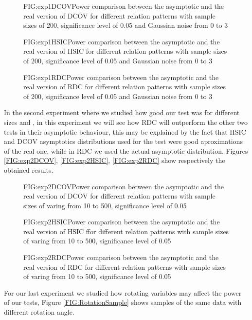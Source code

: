 \begin{figure}[Experiment 1 DCOV asymptotic vs real]{FIG:exp1DCOV}{Power comparison between the asymptotic and the real version of DCOV for different relation patterns with sample sizes of 200, significance level of 0.05 and Gaussian noise from 0 to 3}
\end{figure}
\begin{figure}[Experiment 1 HSIC asymptotic vs real]{FIG:exp1HSIC}{Power comparison between the asymptotic and the real version of HSIC for different relation patterns with sample sizes of 200, significance level of 0.05 and Gaussian noise from 0 to 3}
\end{figure}
\begin{figure}[Experiment 1 RDC asymptotic vs real]{FIG:exp1RDC}{Power comparison between the asymptotic and the real version of RDC for different relation patterns with sample sizes of 200, significance level of 0.05 and Gaussian noise from 0 to 3}
\end{figure}

In the second experiment where we studied how good our test was for different sizes and , in this experiment we will see how RDC will outperform the other two tests in their asymptotic behaviour, this may be explained by the fact that HSIC and DCOV asymptotics distributions used for the test were good aproximations of the real one, while in RDC we used the actual asymptotic distribution. Figures \ref{FIG:exp2DCOV}, \ref{FIG:exp2HSIC}, \ref{FIG:exp2RDC} show respectively the obtained results.

\begin{figure}[Experiment 2 DCOV asymptotic vs real]{FIG:exp2DCOV}{Power comparison between the asymptotic and the real version of DCOV for different relation patterns with sample sizes of varing from 10 to 500, significance level of 0.05}
\end{figure}
\begin{figure}[Experiment 2 HSIC asymptotic vs real]{FIG:exp2HSIC}{Power comparison between the asymptotic and the real version of HSIC ffor different relation patterns with sample sizes of varing from 10 to 500, significance level of 0.05}
\end{figure}
\begin{figure}[Experiment 2 RDC asymptotic vs real]{FIG:exp2RDC}{Power comparison between the asymptotic and the real version of RDC for different relation patterns with sample sizes of varing from 10 to 500, significance level of 0.05}
\end{figure}

For our last experiment we studied how rotating variables may affect the power of our tests, Figure \ref{FIG:RotationSample} shows samples of the same data with different rotation angle.

